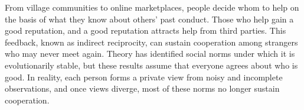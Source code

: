 From village communities to online marketplaces, people decide whom to help on the basis of what they know about others' past conduct\cite{milinski2016,tadelis2016}. Those who help gain a good reputation, and a good reputation attracts help from third parties. This feedback, known as indirect reciprocity, can sustain cooperation among strangers who may never meet again\cite{nowak1998,nowak2005,wedekind2000,milinski2002}. Theory has identified social norms under which it is evolutionarily stable\cite{leimar2001,panchanathan2003,ohtsuki2004,ohtsuki2006}, but these results assume that everyone agrees about who is good. In reality, each person forms a private view from noisy and incomplete observations\cite{takahashi2006,uchida2010}, and once views diverge, most of these norms no longer sustain cooperation\cite{hilbe2018,okada2018,perret2021,fujimoto2023}.

